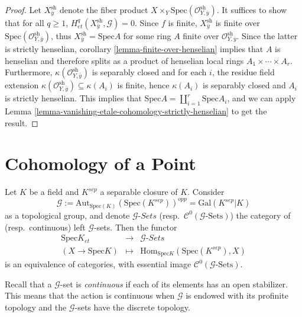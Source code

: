\begin{proof}
Let $X_{\bar y}^\text{sh}$ denote the fiber product $X\times_Y 
\text{Spec}(\mathcal{O}_{Y, \bar y}^\text{sh})$. It suffices to show that for 
all $q\geq 1$, $H_{et}^q(X_{\bar y}^\text{sh}, \mathcal{G})=0$. Since $f$ is 
finite, $X_{\bar y}^\text{sh}$ is finite over $\text{Spec}(\mathcal{O}_{Y, \bar 
y}^\text{sh})$, thus $X_{\bar y}^\text{sh} = \text{Spec} A$ for some ring $A$ 
finite over $\mathcal{O}_{Y, \bar y}^\text{sh}$. Since the latter is strictly 
henselian, corollary \ref{lemma-finite-over-henselian} implies that $A$ 
is henselian and therefore splits as a product of henselian local rings $A_1 
\times \cdots \times A_r$. Furthermore, $\kappa(\mathcal{O}_{Y, \bar 
y}^\text{sh})$ is separably closed and for each $i$, the residue field 
extension $\kappa(\mathcal{O}_{Y, \bar y}^\text{sh}) \subseteq \kappa(A_i)$ is 
finite, hence $\kappa(A_i)$ is separably closed  and $A_i$ is strictly 
henselian. This implies that $\text{Spec} A = \coprod_{i=1}^r \text{Spec} A_i$, 
and we can apply
Lemma \ref{lemma-vanishing-etale-cohomology-strictly-henselian} to get 
the result.
\end{proof}





\section{Cohomology of a Point}
\label{section-cohomology-point}

\begin{lemma}
\label{lemma-sheaves-point}
Let $K$ be a field and $K^{sep}$ a separable closure of $K$. Consider
$$
\mathcal{G} := \text{Aut}_{\text{Spec}(K)}(\text{Spec}(K^{sep}))^{opp}  = 
\text{Gal}(K^{sep} | K)
$$
as a topological group, and denote $\mathcal{G}\textit{-Sets}$
(resp.\ $\mathcal{C}^0(\mathcal{G}\text{-Sets})$)
the category of (resp.\ continuous) left $\mathcal{G}$-sets.
Then the functor
$$
\begin{matrix}
\text{Spec} K _{et} &  \longrightarrow & \mathcal{G}\textit{-Sets} \\
(X\to\text{Spec} K) & \longmapsto & \text{Hom}_{\text{Spec} 
K}\left(\text{Spec}(K^{sep}), X\right)
\end{matrix}
$$
is an equivalence of categories, with essential image 
$\mathcal{C}^0(\mathcal{G}\text{-Sets})$.
\end{lemma}

\noindent
Recall that a $\mathcal{G}$-set is {\it continuous} if each of its elements 
has an open stabilizer. This means that the action is continuous when 
$\mathcal{G}$ is endowed with its profinite topology and the $\mathcal{G}$-sets 
have the discrete topology.

